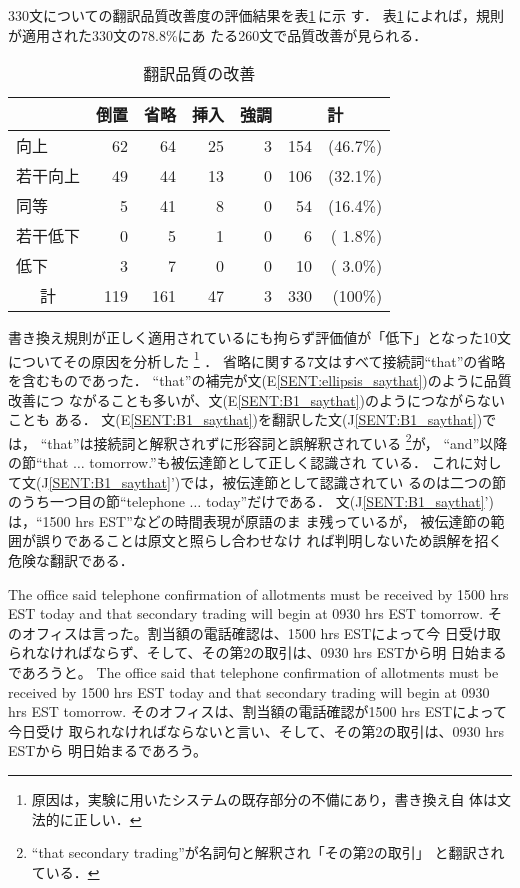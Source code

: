 330文についての翻訳品質改善度の評価結果を表\ref{tab:result_trans}\,に示
す．
表\ref{tab:result_trans}\,によれば，規則が適用された330文の78.8\%にあ
たる260文で品質改善が見られる．
\begin{table}[htbp]
\caption{翻訳品質の改善}
\label{tab:result_trans}
\begin{center}
\begin{tabular}{|l||r|r|r|r|r@{}r|}\hline
&\multicolumn{1}{|c|}{倒置}&\multicolumn{1}{|c|}{省略}
&\multicolumn{1}{|c|}{挿入}&\multicolumn{1}{|c|}{強調}
&\multicolumn{2}{|c|}{計}\\\hline\hline
向上			&  62 &  64 & 25 & 3 & 154 & (46.7\%) \\
若干向上		&  49 &  44 & 13 & 0 & 106 & (32.1\%) \\
同等			&   5 &  41 &  8 & 0 &  54 & (16.4\%) \\
若干低下		&   0 &   5 &  1 & 0 &   6 & ( 1.8\%) \\
低下			&   3 &   7 &  0 & 0 &  10 & ( 3.0\%) \\\hline
\multicolumn{1}{|c||}{計}& 119 & 161 & 47 & 3 & 330 & (100\%)  \\\hline
\end{tabular}
\end{center}
\end{table}

書き換え規則が正しく適用されているにも拘らず評価値が「低下」となった10文
についてその原因を分析した
\footnote{原因は，実験に用いたシステムの既存部分の不備にあり，書き換え自
体は文法的に正しい．}
．
省略に関する7文はすべて接続詞``that''の省略を含むものであった．
``that''の補完が文(E\ref{SENT:ellipsis_saythat})のように品質改善につ
ながることも多いが、文(E\ref{SENT:B1_saythat})のようにつながらないことも
ある．
文(E\ref{SENT:B1_saythat})を翻訳した文(J\ref{SENT:B1_saythat})では，
``that''は接続詞と解釈されずに形容詞と誤解釈されている
\footnote{``that secondary trading''が名詞句と解釈され「その第2の取引」
と翻訳されている．}が，
``and''以降の節``that $\ldots$ tomorrow.''も被伝達節として正しく認識され
ている．
これに対して文(J\ref{SENT:B1_saythat}')では，被伝達節として認識されてい
るのは二つの節のうち一つ目の節``telephone $\ldots$ today''だけである．
文(J\ref{SENT:B1_saythat}')は，``1500 hrs EST''などの時間表現が原語のま
ま残っているが， 被伝達節の範囲が誤りであることは原文と照らし合わせなけ
れば判明しないため誤解を招く危険な翻訳である．
\begin{SENT}
\sentE The office said telephone confirmation of allotments 
must be received by 1500 hrs EST today and that secondary trading will 
begin at 0930 hrs EST tomorrow.   
\sentJ そのオフィスは言った。割当額の電話確認は、1500 hrs ESTによって今
日受け取られなければならず、そして、その第2の取引は、0930 hrs ESTから明
日始まるであろうと。
\sentNewE The office said that telephone confirmation of allotments must 
be received by 1500 hrs EST today and that secondary trading will begin 
at 0930 hrs EST tomorrow.
\sentNewJ そのオフィスは、割当額の電話確認が1500 hrs ESTによって今日受け
取られなければならないと言い、そして、その第2の取引は、0930 hrs ESTから
明日始まるであろう。
\label{SENT:B1_saythat}
\end{SENT}

